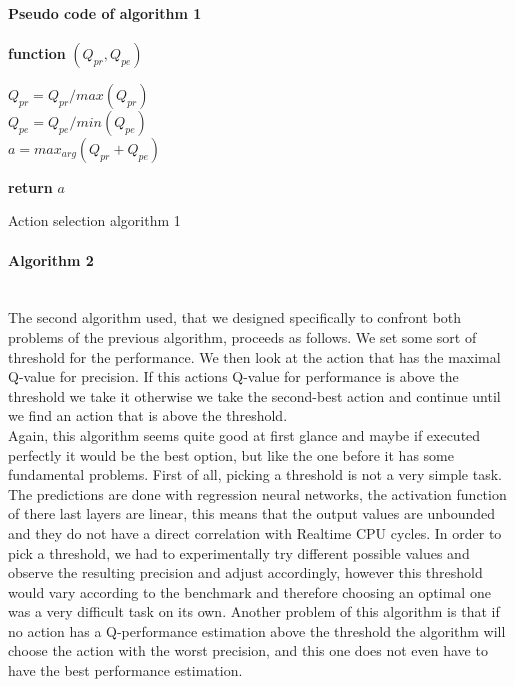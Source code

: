 \paragraph{Pseudo code of algorithm 1}
\begin{center}
\begin{algorithm}[H]

    \textbf{function}  $(Q_{pr},Q_{pe})$\;
    
    
    \Indp{}\Indm
    \Indp{} \Indm
    \Indp
    $Q_{pr} = Q_{pr}/max(Q_{pr})$\\
    $Q_{pe} = Q_{pe}/min(Q_{pe})$\\
    $a = max_{arg}(Q_{pr}+Q_{pe})$
    
  
   \textbf{return} $a$

\caption{Action selection algorithm 1}
\end{algorithm}
\end{center}
\paragraph{Algorithm 2}\mbox{}\\
The second algorithm used, that we designed specifically to confront both problems of the previous algorithm, proceeds as follows. We set some sort of threshold for the performance. We then look at the action that has the maximal Q-value for precision. If this actions Q-value for performance is above the threshold we take it otherwise we take the second-best action and continue until we find an action that is above the threshold.\\
Again, this algorithm seems quite good at first glance and maybe if executed perfectly it would be the best option, but like the one before it has some fundamental problems. First of all, picking a threshold is not a very simple task. The predictions are done with regression neural networks, the activation function of there last layers are linear, this means that the output values are unbounded and they do not have a direct correlation with Realtime CPU cycles. In order to pick a threshold, we had to experimentally try different possible values and observe the resulting precision and adjust accordingly, however this threshold would vary according to the benchmark and therefore choosing an optimal one was a very difficult task on its own. Another problem of this algorithm is that if no action has a Q-performance estimation above the threshold the algorithm will choose the action with the worst precision, and this one does not even have to have the best performance estimation. 
